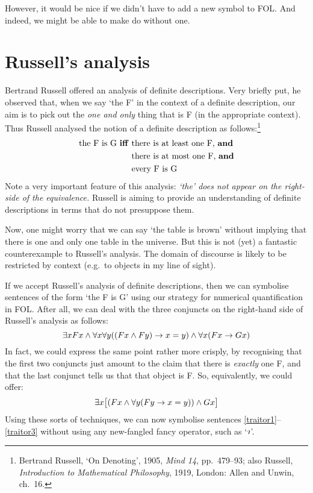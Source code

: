 However, it would be nice if we didn't have to add a new symbol to FOL. And indeed, we might be able to make do without one.

\section{Russell's analysis}
Bertrand Russell offered an analysis of definite descriptions. Very briefly put, he observed that, when we say `the F' in the context of a definite description, our aim is to pick out the \emph{one and only} thing that is F (in the appropriate context). Thus Russell analysed the notion of a definite description as follows:\footnote{Bertrand Russell, `On Denoting', 1905, \emph{Mind 14}, pp.\ 479--93; also Russell, \emph{Introduction to Mathematical Philosophy}, 1919, London: Allen and Unwin, ch.\ 16.}
	\begin{align*}
		\text{the F is G \textbf{iff} }&\text{there is at least one F, \emph{and}}\\
	&\text{there is at most one F, \emph{and}}\\	
	&\text{every F is G}
\end{align*}
Note a very important feature of this analysis: \emph{`the' does not appear on the right-side of the equivalence.} Russell is aiming to provide an understanding of definite descriptions in terms that do not presuppose them. 

Now, one might worry that we can say `the table is brown' without implying that there is one and only one table in the universe. But this is not (yet) a fantastic counterexample to Russell's analysis. The domain of discourse is likely to be restricted by context (e.g.\ to objects in my line of sight).

If we accept Russell's analysis of definite descriptions, then we can symbolise sentences of the form `the F is G' using our strategy for numerical quantification in FOL. After all, we can deal with the three conjuncts on the right-hand side of Russell's analysis as follows:
	$$\exists x Fx \eand \forall x \forall y ((Fx \eand Fy) \eif x = y) \eand \forall x (Fx \eif Gx)$$
In fact, we could express the same point rather more crisply, by recognising that the first two conjuncts just amount to the claim that there is \emph{exactly} one F, and that the last conjunct tells us that that object is F. So, equivalently, we could offer:
	$$\exists x \bigl[(Fx \eand \forall y (Fy \eif x = y)) \eand Gx\bigr]$$
Using these sorts of techniques, we can now symbolise sentences \ref{traitor1}--\ref{traitor3} without using any new-fangled fancy operator, such as `$\maththe$'. 

